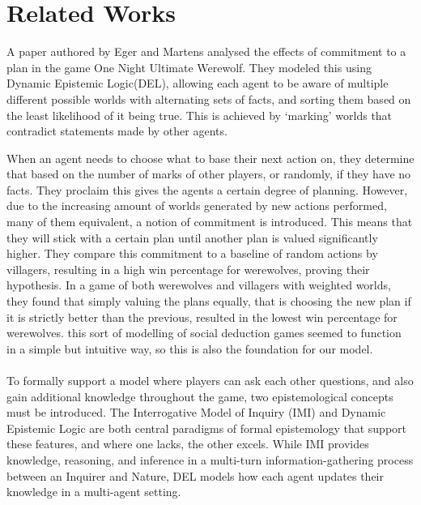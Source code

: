 \section{Related Works} \label{sec:RelatedWorks}
A paper authored by Eger and Martens\cite{commitment} analysed the effects of
commitment to a plan in the game One Night Ultimate Werewolf. They modeled this
using Dynamic Epistemic Logic(DEL), allowing each agent to be aware of multiple
different possible worlds with alternating sets of facts, and sorting them
based on the least likelihood of it being true. This is achieved by ‘marking’
worlds that contradict statements made by other agents.

When an agent needs to choose what to base their next action on, they determine
that based on the number of marks of other players, or randomly, if they have
no facts. They proclaim this gives the agents a certain degree of planning.
However, due to the increasing amount of worlds generated by new actions
performed, many of them equivalent, a notion of commitment is introduced. This
means that they will stick with a certain plan until another plan is valued
significantly higher. They compare this commitment to a baseline of random
actions by villagers, resulting in a high win percentage for werewolves,
proving their hypothesis. In a game of both werewolves and villagers with
weighted worlds, they found that simply valuing the plans equally, that is
choosing the new plan if it is strictly better than the previous, resulted in
the lowest win percentage for werewolves. this sort of modelling of social deduction games seemed to function in a simple but intuitive way, so this is also the foundation for our model.
\\ \\ To formally support a model where players can ask each other
questions, and also gain additional knowledge throughout the game, two
epistemological concepts must be introduced. The Interrogative Model of Inquiry
(IMI) and Dynamic Epistemic Logic are both central paradigms of formal
epistemology that support these features, and where one lacks, the other
excels. While IMI provides knowledge, reasoning, and inference in a multi-turn
information-gathering process between an Inquirer and Nature, DEL models how
each agent updates their knowledge in a multi-agent setting.

